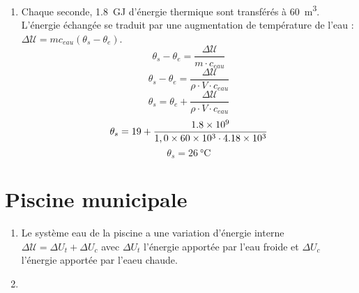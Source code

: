 \documentclass[a4paper,11pt,fleqn]{article}%
\begin{document}
\begin{enumerate}
\begin{enumerate}
\begin{center}
			\end{center}
			\item Au cours d'un cycle, la variation d'énergie interne du système {eau du circuit secondaire} est nulle.
			\item On applique le premier principe : $\Delta \mathcal{U} = \mathcal{W} + Q_f + Q_c = 0$.\\
			En isolant $Q_f$ : $$ Q_f = -\mathcal{W} - Q_c$$
			 $$Q_f = - \num{900E6}-\num{2,7E9} = -\SI{1,8}{\giga\joule}$$
			Le flux thermique entre le circuit secondaire et le circuit de refroidissement est bien égal à \SI{1,8}{\giga\watt}.
		\end{enumerate}
		\item Chaque seconde, \SI{1,8}{\giga\joule} d'énergie thermique sont transférés à \SI{60}{\meter\cubed}. L'énergie échangée se traduit par une augmentation de température de l'eau : $\Delta \mathcal{U} = mc_{eau}(\theta_s - \theta_e)$.
		$$ \theta_s-\theta_e = \frac{\Delta \mathcal{U}}{m\cdot c_{eau}}$$
		$$ \theta_s-\theta_e = \frac{\Delta \mathcal{U}}{\rho \cdot V \cdot c_{eau}}$$
		$$ \theta_s= \theta_e  + \frac{\Delta \mathcal{U}}{\rho \cdot V \cdot c_{eau}}$$
		 $$ \theta_s= 19  + \frac{\num{1,8E9}}{1,0 \times \num{60E3} \cdot \num{4,18E3}} $$
		$$ \theta_s= \SI{26}{\celsius}$$
	\end{enumerate}
	
	\section{Piscine municipale}
	\begin{enumerate}
		\item Le système {eau de la piscine} a une variation d'énergie interne $\Delta \mathcal{U} = \Delta U_t + \Delta U_c$ avec $\Delta U_t$ l'énergie apportée par l'eau froide et $\Delta U_c$ l'énergie apportée par l'eaeu chaude.
		\item 
		
	\end{enumerate}
\end{document}
